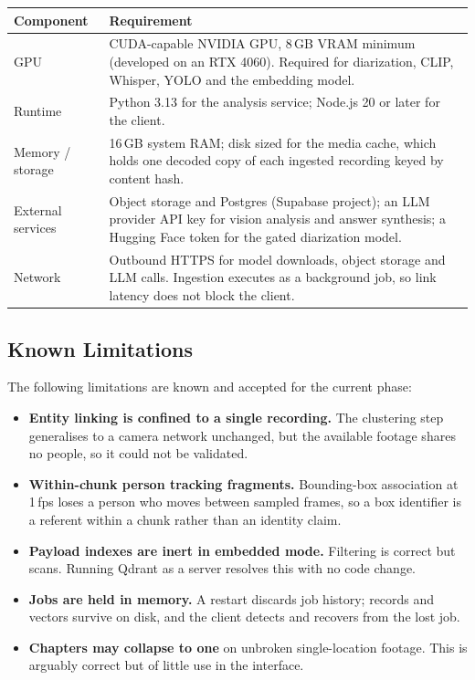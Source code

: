 \begin{table}[htbp]
\centering
\small
\begin{tabularx}{\textwidth}{@{}L{3.6cm}X@{}}
\toprule
\textbf{Component} & \textbf{Requirement} \\
\midrule
GPU              & CUDA-capable NVIDIA GPU, 8\,GB VRAM minimum (developed on an RTX 4060). Required for diarization, CLIP, Whisper, YOLO and the embedding model. \\
Runtime          & Python 3.13 for the analysis service; Node.js 20 or later for the client. \\
Memory / storage & 16\,GB system RAM; disk sized for the media cache, which holds one decoded copy of each ingested recording keyed by content hash. \\
External services & Object storage and Postgres (Supabase project); an LLM provider API key for vision analysis and answer synthesis; a Hugging Face token for the gated diarization model. \\
Network          & Outbound HTTPS for model downloads, object storage and LLM calls. Ingestion executes as a background job, so link latency does not block the client. \\
\bottomrule
\end{tabularx}
\end{table}

\subsection{Known Limitations}

The following limitations are known and accepted for the current phase:

\begin{itemize}
  \item \textbf{Entity linking is confined to a single recording.} The clustering step
        generalises to a camera network unchanged, but the available footage shares no
        people, so it could not be validated.
  \item \textbf{Within-chunk person tracking fragments.} Bounding-box association at
        1\,fps loses a person who moves between sampled frames, so a box identifier is
        a referent within a chunk rather than an identity claim.
  \item \textbf{Payload indexes are inert in embedded mode.} Filtering is correct but
        scans. Running Qdrant as a server resolves this with no code change.
  \item \textbf{Jobs are held in memory.} A restart discards job history; records and
        vectors survive on disk, and the client detects and recovers from the lost
        job.
  \item \textbf{Chapters may collapse to one} on unbroken single-location footage.
        This is arguably correct but of little use in the interface.
\end{itemize}

